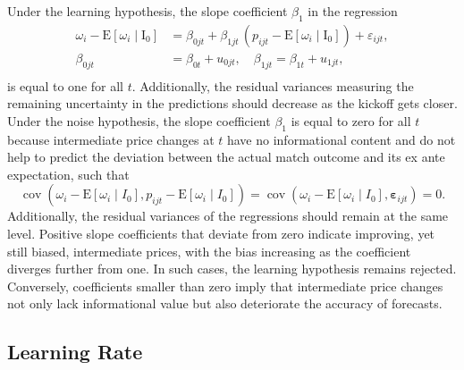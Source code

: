 \documentclass[webpdf,modern,medium]{oup-authoring-template}
\theoremstyle{thmstyleone}%
\theoremstyle{thmstyletwo}%
\theoremstyle{thmstylethree}%
\begin{document}
        Under the learning hypothesis, the slope coefficient $\beta_1$ in the regression
        \begin{equation}
            \begin{split}
                \omega_i - \mathrm{E}[\omega_i \mid \mathrm{I}_0] &= \beta_{0jt} + \beta_{1jt} \, (p_{ijt} - \mathrm{E}[\omega_i \mid \mathrm{I}_0]) + \varepsilon_{ijt}, \\
                \beta_{0jt} &= \beta_{0t} + u_{0jt}, \quad \beta_{1jt} = \beta_{1t} + u_{1jt}, \\
            \end{split}
            \label{eq:unbiasedness_reg}
        \end{equation}
        is equal to one for all $t$. Additionally, the residual variances measuring the remaining uncertainty in the predictions should decrease as the kickoff gets closer. Under the noise hypothesis, the slope coefficient $\beta_1$ is equal to zero for all $t$ because intermediate price changes at $t$ have no informational content and do not help to predict the deviation between the actual match outcome and its ex ante expectation, such that
        \begin{equation*}
            \operatorname{cov}\left(\omega_i - \mathrm{E}\left[\omega_i \mid I_0\right], p_{ijt} - \mathrm{E}\left[\omega_i \mid I_0\right]\right)=\operatorname{cov}\left(\omega_i - \mathrm{E}\left[\omega_i \mid I_0\right], \boldsymbol{\varepsilon}_{ijt}\right)=0.
        \end{equation*}
        Additionally, the residual variances of the regressions should remain at the same level.
        Positive slope coefficients that deviate from zero indicate improving, yet still biased, intermediate prices, with the bias increasing as the coefficient diverges further from one. In such cases, the learning hypothesis remains rejected. Conversely, coefficients smaller than zero imply that intermediate price changes not only lack informational value but also deteriorate the accuracy of forecasts.

    \subsection{Learning Rate}
\end{document}
